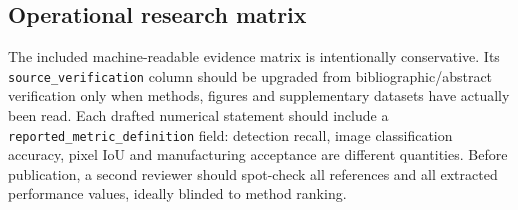 \subsection{Operational research matrix}
The included machine-readable evidence matrix is intentionally conservative. Its \texttt{source\_verification} column should be upgraded from bibliographic/abstract verification only when methods, figures and supplementary datasets have actually been read. Each drafted numerical statement should include a \texttt{reported\_metric\_definition} field: detection recall, image classification accuracy, pixel IoU and manufacturing acceptance are different quantities. Before publication, a second reviewer should spot-check all references and all extracted performance values, ideally blinded to method ranking.
